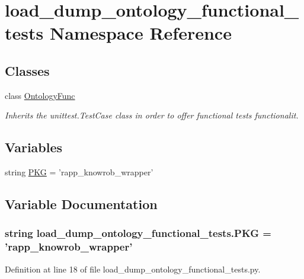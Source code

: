\hypertarget{namespaceload__dump__ontology__functional__tests}{\section{load\-\_\-dump\-\_\-ontology\-\_\-functional\-\_\-tests Namespace Reference}
\label{namespaceload__dump__ontology__functional__tests}
}
\subsection*{Classes}
\begin{DoxyCompactItemize}
\item 
class \hyperlink{classload__dump__ontology__functional__tests_1_1OntologyFunc}{Ontology\-Func}
\begin{DoxyCompactList}\small\item\em Inherits the unittest.\-Test\-Case class in order to offer functional tests functionalit. \end{DoxyCompactList}\end{DoxyCompactItemize}
\subsection*{Variables}
\begin{DoxyCompactItemize}
\item 
string \hyperlink{namespaceload__dump__ontology__functional__tests_a6d142ffa3615a381547c611cafe9df02}{P\-K\-G} = 'rapp\-\_\-knowrob\-\_\-wrapper'
\end{DoxyCompactItemize}


\subsection{Variable Documentation}
\hypertarget{namespaceload__dump__ontology__functional__tests_a6d142ffa3615a381547c611cafe9df02}{
\subsubsection[{P\-K\-G}]{\setlength{\rightskip}{0pt plus 5cm}string load\-\_\-dump\-\_\-ontology\-\_\-functional\-\_\-tests.\-P\-K\-G = 'rapp\-\_\-knowrob\-\_\-wrapper'}}\label{namespaceload__dump__ontology__functional__tests_a6d142ffa3615a381547c611cafe9df02}


Definition at line 18 of file load\-\_\-dump\-\_\-ontology\-\_\-functional\-\_\-tests.\-py.


